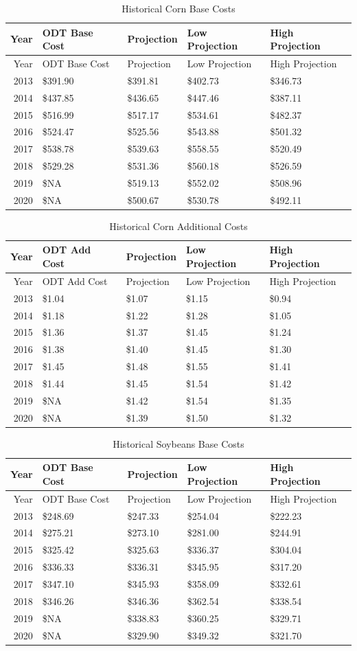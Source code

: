 \documentclass[]{article}
\begin{document}
\newpage

\begin{longtable}[]{@{}rllll@{}}
\caption{Historical Corn Base Costs}\tabularnewline
\toprule
Year & ODT Base Cost & Projection & Low Projection & High
Projection\tabularnewline
\midrule
\endfirsthead
\toprule
Year & ODT Base Cost & Projection & Low Projection & High
Projection\tabularnewline
\midrule
\endhead
2013 & \$391.90 & \$391.81 & \$402.73 & \$346.73\tabularnewline
2014 & \$437.85 & \$436.65 & \$447.46 & \$387.11\tabularnewline
2015 & \$516.99 & \$517.17 & \$534.61 & \$482.37\tabularnewline
2016 & \$524.47 & \$525.56 & \$543.88 & \$501.32\tabularnewline
2017 & \$538.78 & \$539.63 & \$558.55 & \$520.49\tabularnewline
2018 & \$529.28 & \$531.36 & \$560.18 & \$526.59\tabularnewline
2019 & \$NA & \$519.13 & \$552.02 & \$508.96\tabularnewline
2020 & \$NA & \$500.67 & \$530.78 & \$492.11\tabularnewline
\bottomrule
\end{longtable}

\begin{longtable}[]{@{}rllll@{}}
\caption{Historical Corn Additional Costs}\tabularnewline
\toprule
Year & ODT Add Cost & Projection & Low Projection & High
Projection\tabularnewline
\midrule
\endfirsthead
\toprule
Year & ODT Add Cost & Projection & Low Projection & High
Projection\tabularnewline
\midrule
\endhead
2013 & \$1.04 & \$1.07 & \$1.15 & \$0.94\tabularnewline
2014 & \$1.18 & \$1.22 & \$1.28 & \$1.05\tabularnewline
2015 & \$1.36 & \$1.37 & \$1.45 & \$1.24\tabularnewline
2016 & \$1.38 & \$1.40 & \$1.45 & \$1.30\tabularnewline
2017 & \$1.45 & \$1.48 & \$1.55 & \$1.41\tabularnewline
2018 & \$1.44 & \$1.45 & \$1.54 & \$1.42\tabularnewline
2019 & \$NA & \$1.42 & \$1.54 & \$1.35\tabularnewline
2020 & \$NA & \$1.39 & \$1.50 & \$1.32\tabularnewline
\bottomrule
\end{longtable}

\newpage

\begin{longtable}[]{@{}rllll@{}}
\caption{Historical Soybeans Base Costs}\tabularnewline
\toprule
Year & ODT Base Cost & Projection & Low Projection & High
Projection\tabularnewline
\midrule
\endfirsthead
\toprule
Year & ODT Base Cost & Projection & Low Projection & High
Projection\tabularnewline
\midrule
\endhead
2013 & \$248.69 & \$247.33 & \$254.04 & \$222.23\tabularnewline
2014 & \$275.21 & \$273.10 & \$281.00 & \$244.91\tabularnewline
2015 & \$325.42 & \$325.63 & \$336.37 & \$304.04\tabularnewline
2016 & \$336.33 & \$336.31 & \$345.95 & \$317.20\tabularnewline
2017 & \$347.10 & \$345.93 & \$358.09 & \$332.61\tabularnewline
2018 & \$346.26 & \$346.36 & \$362.54 & \$338.54\tabularnewline
2019 & \$NA & \$338.83 & \$360.25 & \$329.71\tabularnewline
2020 & \$NA & \$329.90 & \$349.32 & \$321.70\tabularnewline
\bottomrule
\end{longtable}
\end{document}
